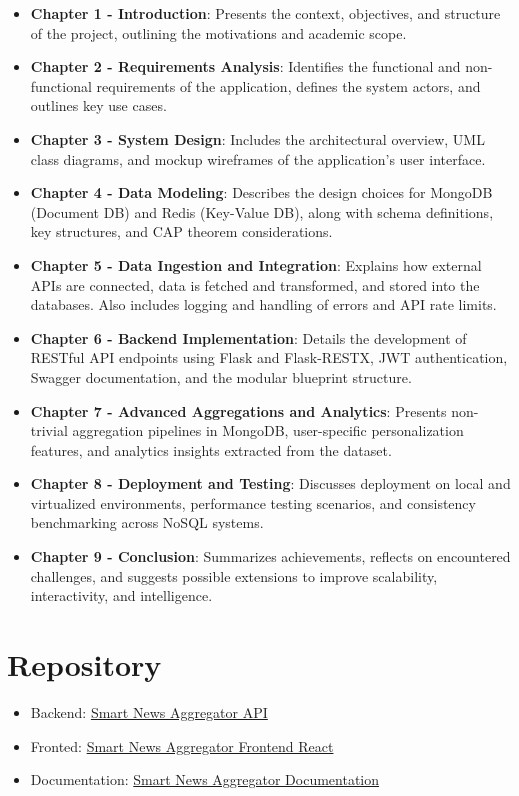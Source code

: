 \begin{itemize}
    \item \textbf{Chapter 1 - Introduction}: Presents the context, objectives, and structure of the project, outlining the motivations and academic scope.
    \item \textbf{Chapter 2 - Requirements Analysis}: Identifies the functional and non-functional requirements of the application, defines the system actors, and outlines key use cases.
    \item \textbf{Chapter 3 - System Design}: Includes the architectural overview, UML class diagrams, and mockup wireframes of the application’s user interface.
    \item \textbf{Chapter 4 - Data Modeling}: Describes the design choices for MongoDB (Document DB) and Redis (Key-Value DB), along with schema definitions, key structures, and CAP theorem considerations.
    \item \textbf{Chapter 5 - Data Ingestion and Integration}: Explains how external APIs are connected, data is fetched and transformed, and stored into the databases.
    Also includes logging and handling of errors and API rate limits.
    \item \textbf{Chapter 6 - Backend Implementation}: Details the development of RESTful API endpoints using Flask and Flask-RESTX, JWT authentication, Swagger documentation, and the modular blueprint structure.
    \item \textbf{Chapter 7 - Advanced Aggregations and Analytics}: Presents non-trivial aggregation pipelines in MongoDB, user-specific personalization features, and analytics insights extracted from the dataset.
    \item \textbf{Chapter 8 - Deployment and Testing}: Discusses deployment on local and virtualized environments, performance testing scenarios, and consistency benchmarking across NoSQL systems.
    \item \textbf{Chapter 9 - Conclusion}: Summarizes achievements, reflects on encountered challenges, and suggests possible extensions to improve scalability, interactivity, and intelligence.
\end{itemize}


\section{Repository}\label{sec:repository}

\begin{itemize}
    \item Backend: \href{https://github.com/adrienKoumgangT/smart-news-aggregator-api}{Smart News Aggregator API}
    \item Fronted: \href{https://github.com/adrienKoumgangT/smart-news-aggregator-fe-react}{Smart News Aggregator Frontend React}
    \item Documentation: \href{https://github.com/adrienKoumgangT/smart-news-aggregator-documentation}{Smart News Aggregator Documentation}
\end{itemize}

